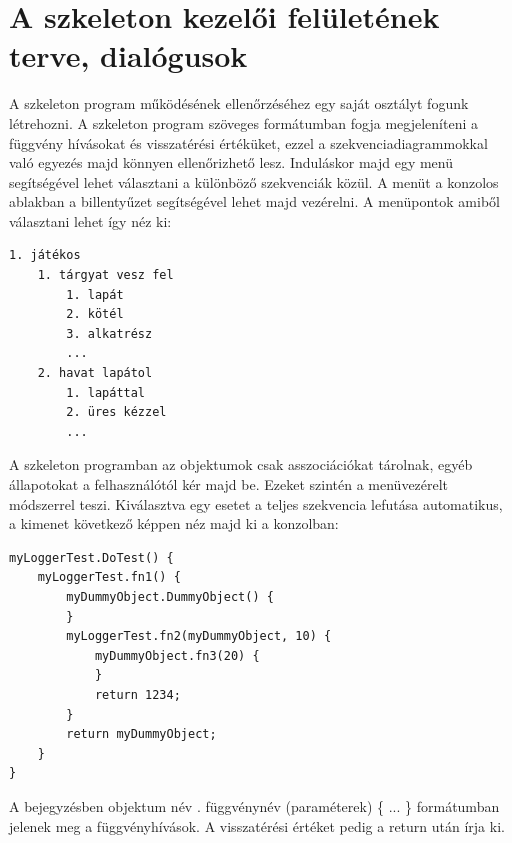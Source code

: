 
\section{A szkeleton kezelői felületének terve, dialógusok}

A szkeleton program működésének ellenőrzéséhez egy saját osztályt fogunk létrehozni. A szkeleton program szöveges formátumban fogja megjeleníteni a függvény hívásokat és visszatérési értéküket, ezzel a szekvenciadiagrammokkal való egyezés majd könnyen ellenőrizhető lesz. Induláskor majd egy menü segítségével lehet választani a különböző szekvenciák közül. A menüt a konzolos ablakban a billentyűzet segítségével lehet majd vezérelni. A menüpontok amiből választani lehet így néz ki:
\begin{Verbatim}[samepage=true]
1. játékos
	1. tárgyat vesz fel
		1. lapát
		2. kötél
		3. alkatrész
		...
	2. havat lapátol
		1. lapáttal
		2. üres kézzel
		...
\end{Verbatim}
A szkeleton programban az objektumok csak asszociációkat tárolnak, egyéb állapotokat a felhasználótól kér majd be. Ezeket szintén a menüvezérelt módszerrel teszi. Kiválasztva egy esetet a teljes szekvencia lefutása automatikus, a kimenet következő képpen néz majd ki a konzolban:
\begin{Verbatim}[samepage=true]
myLoggerTest.DoTest() {
    myLoggerTest.fn1() {
        myDummyObject.DummyObject() {
        }
        myLoggerTest.fn2(myDummyObject, 10) {
            myDummyObject.fn3(20) {
            }
            return 1234;
        }
        return myDummyObject;
    }
}
\end{Verbatim}
A bejegyzésben objektum név . függvénynév (paraméterek) \{ ... \} formátumban jelenek meg a függvényhívások. A visszatérési értéket pedig a return után írja ki.

